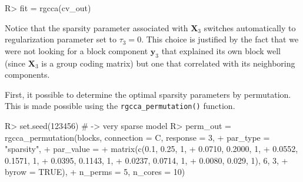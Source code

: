 \documentclass[
]{jss}
\begin{document}
\normalsize

\footnotesize

\begin{CodeChunk}
\begin{CodeInput}
R> fit = rgcca(cv_out)
\end{CodeInput}
\end{CodeChunk}

\normalsize

Notice that the sparsity parameter associated with \(\mathbf{X}_3\)
switches automatically to regularization parameter set to
\(\tau_3 = 0\). This choice is justified by the fact that we were not
looking for a block component \(\mathbf{y}_3\) that explained its own
block well (since \(\mathbf{X}_3\) is a group coding matrix) but one
that correlated with its neighboring components.

First, it possible to determine the optimal sparsity parameters by
permutation. This is made possible using the
\texttt{rgcca\_permutation()} function.

\begin{CodeChunk}
\begin{CodeInput}
R> set.seed(123456) # -> very sparse model
R> perm_out = rgcca_permutation(blocks, connection = C, response = 3,
+                                 par_type = "sparsity",
+                                 par_value = 
+                                   matrix(c(0.1, 0.25, 1, 
+                                            0.0710, 0.2000, 1,
+                                            0.0552, 0.1571, 1, 
+                                            0.0395, 0.1143, 1,
+                                            0.0237, 0.0714, 1, 
+                                            0.0080, 0.029, 1), 6, 3, 
+                                          byrow = TRUE),
+                                 n_perms = 5, n_cores = 10)
\end{CodeInput}
\end{CodeChunk}

\footnotesize
\end{document}
